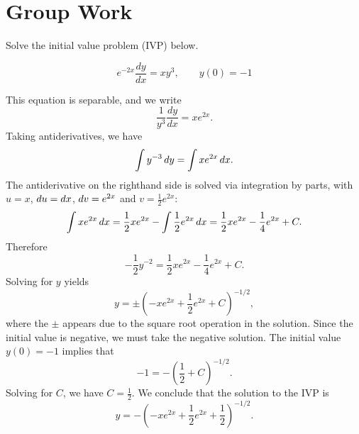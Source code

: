 \documentclass[noauthor,handout]{ximera}
\begin{document}
\section{Group Work}
\begin{problem}
Solve the initial value problem (IVP) below.  

\[
e^{-2x} \frac{dy}{dx} = xy^3, \qquad y(0)=-1
\]

\begin{freeResponse}
This equation is separable, and we write
$$
\frac{1}{y^3} \frac{dy}{dx} = x e^{2x}. 
$$
Taking antiderivatives, we have
$$
\int y^{-3} \mathop{}\!d y = \int x e^{2x} \mathop{}\!d x.
$$
The antiderivative on the righthand side is solved via integration by parts, with $u=x$, $\mathop{}\!d u = \mathop{}\!d x$, $\mathop{}\!d v = e^{2x}$ and $v = \frac{1}{2}e^{2x}$:
$$
\int x e^{2x} \mathop{}\!d x = \frac{1}{2} x e^{2x} - \int \frac{1}{2} e^{2x} \mathop{}\!d x = \frac{1}{2} x e^{2x} - \frac{1}{4} e^{2x} + C.
$$
Therefore
$$
-\frac{1}{2} y^{-2} = \frac{1}{2} x e^{2x} - \frac{1}{4} e^{2x} + C.
$$
Solving for $y$ yields
$$
y = \pm \left(-x e^{2x} + \frac{1}{2} e^{2x} + C\right)^{-1/2},
$$
where the $\pm$ appears due to the square root operation in the solution. Since the initial value is negative, we must take the negative solution. The initial value $y(0)=-1$ implies that
$$
-1 = -\left(\frac{1}{2} + C \right)^{-1/2}.
$$
Solving for $C$, we have $C = \frac{1}{2}$. We conclude that the solution to the IVP is 
$$
y = -\left(-x e^{2x} + \frac{1}{2} e^{2x} + \frac{1}{2}\right)^{-1/2}.
$$
\end{freeResponse}
\end{problem}


\end{document}
